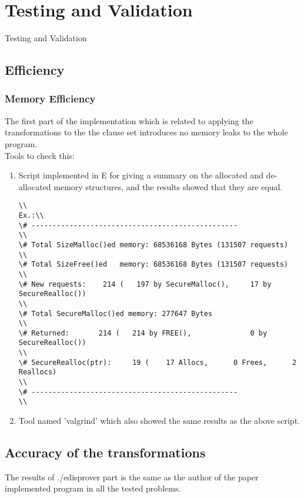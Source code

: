 \chapter{Testing and Validation}\label{chap:test_and_val}
Testing and Validation


\section{Efficiency}
\subsection{Memory Efficiency}
The first part of the implementation which is related to applying the transformations to the the clause set introduces no memory leaks to the whole program.
\\
Tools to check this:
\begin{enumerate}

\item Script implemented in E for giving a summary on the allocated and de-allocated memory structures, and the results showed that they are equal.
\begin{lstlisting}
\\
Ex.:\\
\# -------------------------------------------------
\\
\# Total SizeMalloc()ed memory: 68536168 Bytes (131507 requests)
\\
\# Total SizeFree()ed   memory: 68536168 Bytes (131507 requests)
\\
\# New requests:    214 (   197 by SecureMalloc(),     17 by SecureRealloc())
\\
\# Total SecureMalloc()ed memory: 277647 Bytes
\\
\# Returned:       214 (   214 by FREE(),              0 by SecureRealloc())
\\
\# SecureRealloc(ptr):     19 (    17 Allocs,      0 Frees,      2 Reallocs)
\\
\# -------------------------------------------------
\\
\end{lstlisting}


\item Tool named 'valgrind' which also showed the same results as the above script.

\end{enumerate}


\section{Accuracy of the transformations}
The results of ./edisprover part is the same as the author of the paper implemented program in all the tested problems.